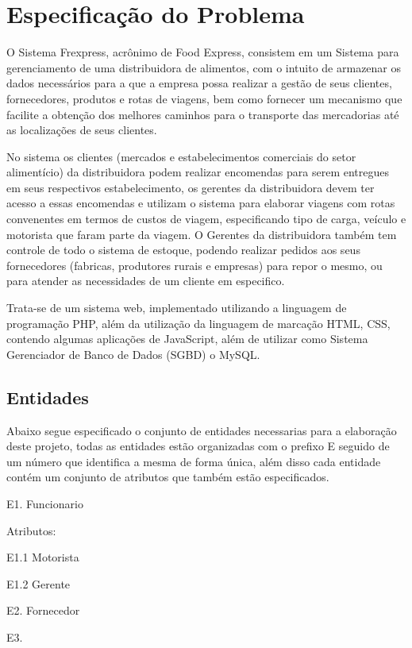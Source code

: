 \documentclass[12pt, onecolumn, titlepage]{article}
\begin{document}
\section{Especificação do Problema}
\label{sect:especificacao}

O Sistema Frexpress, acrônimo de Food Express, consistem em um Sistema para gerenciamento de uma distribuidora de alimentos, com o intuito de armazenar os dados necessários para a que a empresa possa realizar a gestão de seus clientes, fornecedores, produtos e rotas de viagens, bem como fornecer um mecanismo que facilite a obtenção dos melhores caminhos para o transporte das mercadorias até as localizações de seus clientes.

No sistema os clientes (mercados e estabelecimentos comerciais do setor alimentício) da distribuidora podem realizar encomendas para serem entregues em seus respectivos estabelecimento, os gerentes da distribuidora devem ter acesso a essas encomendas e utilizam o sistema para elaborar viagens com rotas convenentes em termos de custos de viagem, especificando tipo de carga, veículo e motorista que faram parte da viagem. O Gerentes da distribuidora também tem controle de todo o sistema de estoque, podendo realizar pedidos aos seus fornecedores (fabricas, produtores rurais e empresas) para repor o mesmo, ou para atender as necessidades de um cliente em especifico.

Trata-se de um sistema web, implementado utilizando a linguagem de programação PHP, além da utilização da linguagem de marcação HTML, CSS, contendo algumas aplicações de JavaScript, além de utilizar como Sistema Gerenciador de Banco de Dados (SGBD) o MySQL.

\subsection{Entidades}
\label{sect:entidades}

Abaixo segue especificado o conjunto de entidades necessarias para a elaboração deste projeto, todas as entidades estão organizadas com o prefixo E seguido de um número que identifica a mesma de forma única, além disso cada entidade contém um conjunto de atributos que também estão especificados.

\begin{description}

\item E1. Funcionario
\item \qquad Atributos: 

\item E1.1 Motorista
\item \qquad

\item E1.2 Gerente
\item \qquad

\item E2. Fornecedor
\item \qquad

\item E3. 

\end{description}
\end{document}
